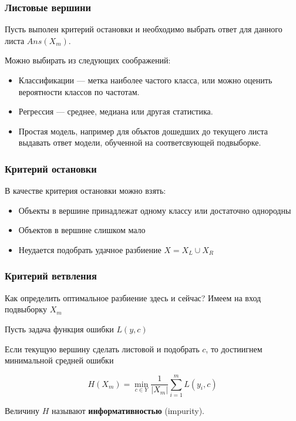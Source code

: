 \documentclass{beamer}
\begin{document}
	\begin{frame}
		\frametitle{Листовые вершини}

		Пусть выполен критерий остановки и необходимо выбрать ответ для данного листа $Ans(X_m)$.

		\vspace{15pt}

		Можно выбирать из следующих соображений:
		\begin{itemize}
			\item Классификации --- метка наиболее частого класса, или можно оценить вероятности классов по
			частотам.
			\item Регрессия --- среднее, медиана или другая статистика.
			\item Простая модель, например для объктов дошедших до текущего листа выдавать ответ модели, обученной на
			соответсвующей подвыборке.
		\end{itemize}
	\end{frame}

	\begin{frame}
		\frametitle{Критерий остановки}

		В качестве критерия остановки можно взять:

		\begin{itemize}
			\item Объекты в вершине принадлежат одному классу или достаточно однородны
			\item Объектов в вершине слишком мало
			\item Неудается подобрать удачное разбиение $X = X_L \cup X_R$
		\end{itemize}
	\end{frame}

	\begin{frame}
		\frametitle{Критерий ветвления}

		Как определить оптимальное разбиение здесь и сейчас? Имеем на вход подвыборку $X_m$

		Пусть задача функция ошибки $L(y, c)$ 

		\vspace{15pt}
		
		Если текущую вершину сделать листовой и подобрать $c$, то достиигнем минимальной средней ошибки

		\[
		H(X_m) = \min_{c \in Y} \frac{1}{|X_m|} \sum_{i=1}^{m} L(y_i, c)
		\]

		Величину $H$ называют \textbf{информативностью} (impurity).
	\end{frame}
\end{document}
